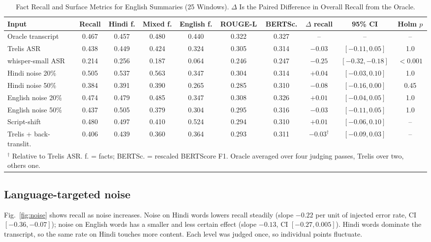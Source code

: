 \documentclass[conference]{IEEEtran}
\begin{document}
\begin{table}[t]
\caption{Fact Recall and Surface Metrics for English Summaries (25 Windows). $\Delta$ Is the Paired Difference in Overall Recall from the Oracle.}
\label{tab:main}
\centering
\footnotesize
\setlength{\tabcolsep}{4pt}
\begin{tabular}{lccccccccc}
\toprule
Input & Recall & Hindi f. & Mixed f. & English f. & ROUGE-L & BERTSc. & $\Delta$ recall & 95\% CI & Holm $p$ \\
\midrule
Oracle transcript & 0.467 & 0.457 & 0.480 & 0.440 & 0.322 & 0.327 & -- & -- & -- \\
Trelis ASR & 0.438 & 0.449 & 0.424 & 0.324 & 0.305 & 0.314 & $-0.03$ & $[-0.11, 0.05]$ & 1.0 \\
whisper-small ASR & 0.214 & 0.256 & 0.187 & 0.064 & 0.246 & 0.247 & $-0.25$ & $[-0.32, -0.18]$ & $<0.001$ \\
\midrule
Hindi noise 20\% & 0.505 & 0.537 & 0.563 & 0.347 & 0.304 & 0.314 & $+0.04$ & $[-0.03, 0.10]$ & 1.0 \\
Hindi noise 50\% & 0.384 & 0.391 & 0.390 & 0.265 & 0.285 & 0.310 & $-0.08$ & $[-0.16, 0.00]$ & 0.45 \\
English noise 20\% & 0.474 & 0.479 & 0.485 & 0.347 & 0.308 & 0.326 & $+0.01$ & $[-0.04, 0.05]$ & 1.0 \\
English noise 50\% & 0.437 & 0.505 & 0.379 & 0.304 & 0.295 & 0.316 & $-0.03$ & $[-0.11, 0.05]$ & 1.0 \\
\midrule
Script-shift & 0.480 & 0.497 & 0.410 & 0.524 & 0.294 & 0.310 & $+0.01$ & $[-0.06, 0.10]$ & -- \\
Trelis + back-translit. & 0.406 & 0.439 & 0.360 & 0.364 & 0.293 & 0.311 & $-0.03^{\dagger}$ & $[-0.09, 0.03]$ & -- \\
\bottomrule
\multicolumn{10}{l}{\scriptsize $^{\dagger}$ Relative to Trelis ASR. f. = facts; BERTSc. = rescaled BERTScore F1. Oracle averaged over four judging passes, Trelis over two, others one.}
\end{tabular}
\end{table}

\subsection{Language-targeted noise}
Fig.~\ref{fig:noise} shows recall as noise increases. Noise on Hindi words lowers recall steadily (slope $-0.22$ per unit of injected error rate, CI $[-0.36, -0.07]$); noise on English words has a smaller and less certain effect (slope $-0.13$, CI $[-0.27, 0.005]$). Hindi words dominate the transcript, so the same rate on Hindi touches more content. Each level was judged once, so individual points fluctuate.
\end{document}
